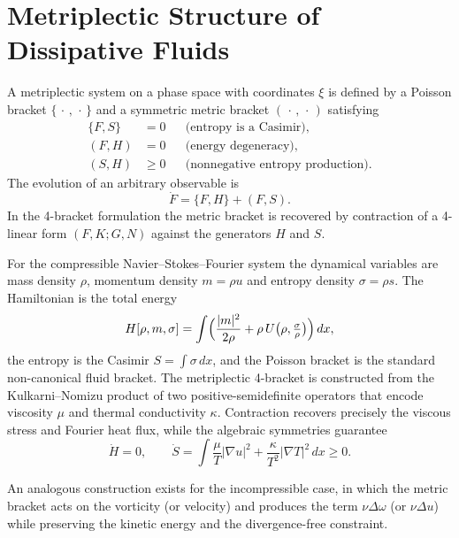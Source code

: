 \documentclass[11pt,a4paper]{article}
\begin{document}
\section{Metriplectic Structure of Dissipative Fluids}
A metriplectic system on a phase space with coordinates \(\xi\) is defined by a Poisson bracket \(\{\,\cdot\,,\,\cdot\,\}\) and a symmetric metric bracket \((\,\cdot\,,\,\cdot\,)\) satisfying
\begin{align}
\{F,S\} &= 0 && \text{(entropy is a Casimir)},\\
(F,H) &= 0 && \text{(energy degeneracy)},\\
(S,H) &\ge 0 && \text{(nonnegative entropy production)}.
\end{align}
The evolution of an arbitrary observable is
\begin{equation}
\dot F = \{F,H\} + (F,S).
\end{equation}
In the 4-bracket formulation the metric bracket is recovered by contraction of a 4-linear form \((F,K;G,N)\) against the generators \(H\) and \(S\).

For the compressible Navier--Stokes--Fourier system the dynamical variables are mass density \(\rho\), momentum density \(m=\rho u\) and entropy density \(\sigma=\rho s\). The Hamiltonian is the total energy
\begin{equation}
H[\rho,m,\sigma] = \int\Bigl(\frac{|m|^2}{2\rho}+\rho\,U\bigl(\rho,\tfrac{\sigma}{\rho}\bigr)\Bigr)\,dx,
\end{equation}
the entropy is the Casimir \(S=\int\sigma\,dx\), and the Poisson bracket is the standard non-canonical fluid bracket. The metriplectic 4-bracket is constructed from the Kulkarni--Nomizu product of two positive-semidefinite operators that encode viscosity \(\mu\) and thermal conductivity \(\kappa\). Contraction recovers precisely the viscous stress and Fourier heat flux, while the algebraic symmetries guarantee
\begin{equation}
\dot H=0,\qquad\dot S=\int\frac{\mu}{T}|\nabla u|^2+\frac{\kappa}{T^2}|\nabla T|^2\,dx\ge0.
\end{equation}

An analogous construction exists for the incompressible case, in which the metric bracket acts on the vorticity (or velocity) and produces the term \(\nu\Delta\omega\) (or \(\nu\Delta u\)) while preserving the kinetic energy and the divergence-free constraint.
\end{document}
